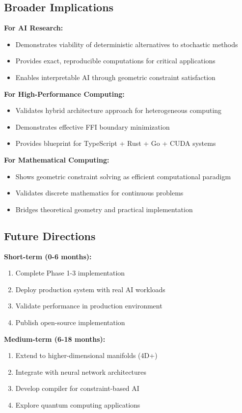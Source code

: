 \documentclass{article}
\begin{document}
\subsection{Broader Implications}

\textbf{For AI Research:}
\begin{itemize}
    \item Demonstrates viability of deterministic alternatives to stochastic methods
    \item Provides exact, reproducible computations for critical applications
    \item Enables interpretable AI through geometric constraint satisfaction
\end{itemize}

\textbf{For High-Performance Computing:}
\begin{itemize}
    \item Validates hybrid architecture approach for heterogeneous computing
    \item Demonstrates effective FFI boundary minimization
    \item Provides blueprint for TypeScript + Rust + Go + CUDA systems
\end{itemize}

\textbf{For Mathematical Computing:}
\begin{itemize}
    \item Shows geometric constraint solving as efficient computational paradigm
    \item Validates discrete mathematics for continuous problems
    \item Bridges theoretical geometry and practical implementation
\end{itemize}

\subsection{Future Directions}

\textbf{Short-term (0-6 months):}
\begin{enumerate}
    \item Complete Phase 1-3 implementation
    \item Deploy production system with real AI workloads
    \item Validate performance in production environment
    \item Publish open-source implementation
\end{enumerate}

\textbf{Medium-term (6-18 months):}
\begin{enumerate}
    \item Extend to higher-dimensional manifolds (4D+)
    \item Integrate with neural network architectures
    \item Develop compiler for constraint-based AI
    \item Explore quantum computing applications
\end{enumerate}
\end{document}
